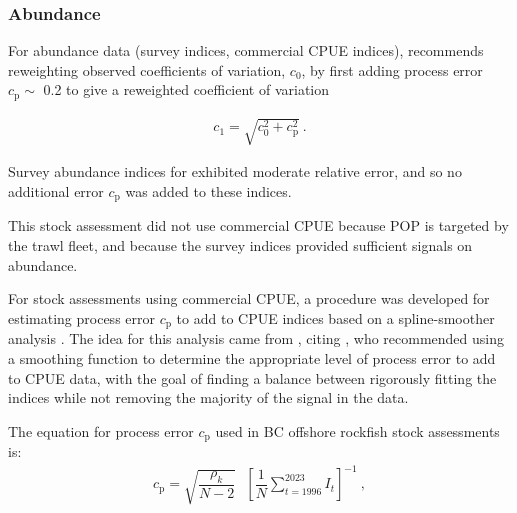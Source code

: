 \documentclass[11pt]{book}
\newcommand{\comment}[1]{}                    %
\def\vsd{\vspace*{1ex}}%
\renewcommand{\eb}{\vsd \vsd \begin{eqnarray}}
\renewcommand{\ee}{\end{eqnarray} \vsd }
\begin{document}
\subsubsection{Abundance} \label{sss:rwt_abund}


For abundance data (survey indices, commercial CPUE indices), \citet{Francis:2011} recommends reweighting observed coefficients of variation, $c_0$, by first adding process error $c_\text{p} \sim$ 0.2 to give a reweighted coefficient of variation

\eb
c_1 = \sqrt{c_0^2 + c_\text{p}^2}~. \label{reweight}
\ee

Survey abundance indices for \spc{} exhibited moderate relative error, and so no additional error $c_\text{p}$ was added to these indices.

This stock assessment did not use commercial CPUE because POP is targeted by the trawl fleet, and because the survey indices provided sufficient signals on abundance.

For stock assessments using commercial CPUE, a procedure was developed for estimating process error $c_\text{p}$ to add to CPUE indices based on a spline-smoother analysis \citep{Starr-Haigh:2021_wwr}.
The idea for this analysis came from \citet{Francis:2011}, citing \citet{Clark-Hare:2006}, who recommended using a smoothing function to determine the appropriate level of process error to add to CPUE data, with the goal of finding a balance between rigorously fitting the indices while not removing the majority of the signal in the data.
\comment{
An arbitrary sequence of length 50, comprising degrees of freedom (DF,~$\nu_i$), where $i=2,...,N$ and $N$~= number of CPUE values $U_t$ from $t=1996,...,2023$, was used to fit the CPUE data with a spline smoother.
At $i=N$, the spline curve fit the data perfectly and the residual sum of squares (RSS, $\rho_N$) was 0.
Using spline fits across a range of trial DF $\nu_i$, values of RSS $\rho_i$ formed a logistic-type curve with an inflection point at $i=k$ (Figure~\ref{fig:CPUEres-CVpro-CAR}).
The difference between point estimates of $\rho_i$ (proxy for the slope $\delta_i$) yielded a concave curve with a minimum $\delta_i$, which occurred close to the inflection point $k$.
At the inflection point $k$, $\nu_k$=~5.4 for QCS+WCVI+WCHG, corresponding to $\rho_k$=~0.83, which was converted to $c_\text{p}$=~0 using:
\vspace{-0.25\baselineskip}%
}
The equation for process error $c_\text{p}$ used in BC offshore rockfish stock assessments is:
\eb
c_\text{p} = \sqrt{\dfrac{\rho_k}{N-2}}~~~{\left[ \dfrac{1}{N} \sum\limits_{t=1996}^{2023} I_t \right]}^{-1}~, \label{cvpro.cpue}
\ee
\end{document}
